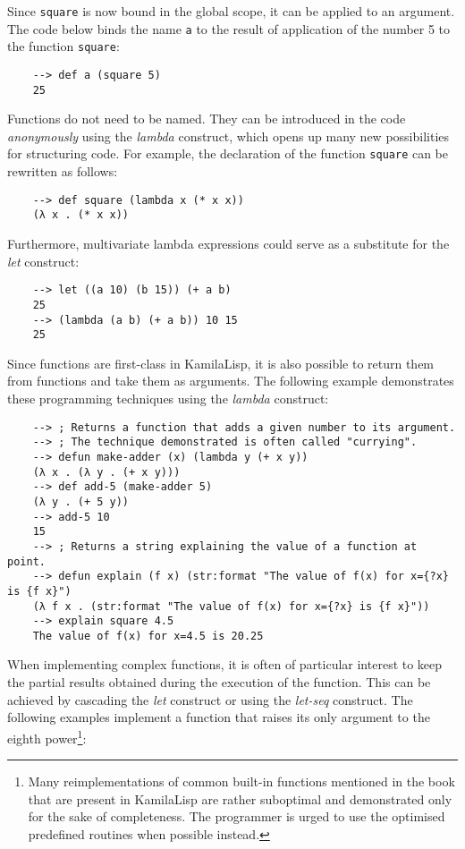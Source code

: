Since \verb|square| is now bound in the global scope, it can be applied to an argument. The code below binds the name \verb|a| to the result of application of the number 5 to the function \verb|square|:

\begin{Verbatim}
    --> def a (square 5)
    25
\end{Verbatim}

Functions do not need to be named. They can be introduced in the code \textit{anonymously} using the \textit{lambda} construct, which opens up many new possibilities for structuring code. For example, the declaration of the function \verb|square| can be rewritten as follows:

\begin{Verbatim}
    --> def square (lambda x (* x x))
    (λ x . (* x x))
\end{Verbatim}

Furthermore, multivariate lambda expressions could serve as a substitute for the \textit{let} construct:

\begin{Verbatim}
    --> let ((a 10) (b 15)) (+ a b)
    25
    --> (lambda (a b) (+ a b)) 10 15
    25
\end{Verbatim}

Since functions are first-class in KamilaLisp, it is also possible to return them from functions and take them as arguments. The following example demonstrates these programming techniques using the \textit{lambda} construct:

\begin{Verbatim}
    --> ; Returns a function that adds a given number to its argument.
    --> ; The technique demonstrated is often called "currying".
    --> defun make-adder (x) (lambda y (+ x y))
    (λ x . (λ y . (+ x y)))
    --> def add-5 (make-adder 5)
    (λ y . (+ 5 y))
    --> add-5 10
    15
    --> ; Returns a string explaining the value of a function at point.
    --> defun explain (f x) (str:format "The value of f(x) for x={?x} is {f x}")
    (λ f x . (str:format "The value of f(x) for x={?x} is {f x}"))
    --> explain square 4.5
    The value of f(x) for x=4.5 is 20.25
\end{Verbatim}

When implementing complex functions, it is often of particular interest to keep the partial results obtained during the execution of the function. This can be achieved by cascading the \textit{let} construct or using the \textit{let-seq} construct. The following examples implement a function that raises its only argument to the eighth power\footnote{Many reimplementations of common built-in functions mentioned in the book that are present in KamilaLisp are rather suboptimal and demonstrated only for the sake of completeness. The programmer is urged to use the optimised predefined routines when possible instead.}:

